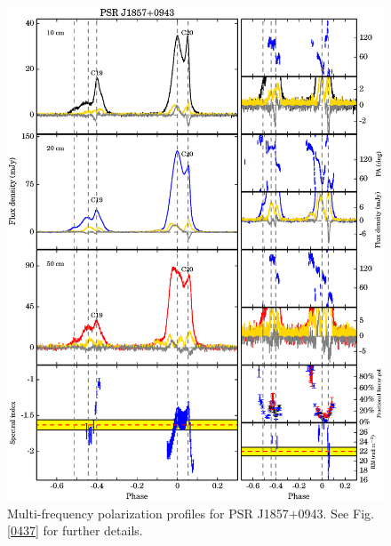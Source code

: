 \documentclass[useAMS,usenatbib]{mn2e}
\begin{document}
\begin{appendices}
\begin{figure}
\begin{center}
\includegraphics[width=6 in]{1857.ps}
\caption{Multi-frequency polarization profiles for PSR J1857$+$0943. 
See Fig. \ref{0437} for further details.}
\label{1857}
\end{center}
\end{figure}


\end{appendices}
\end{document}
